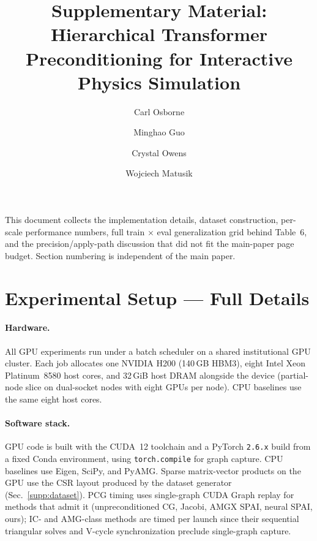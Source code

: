 \documentclass[acmtog]{acmart}
\begin{document}
\title{Supplementary Material: Hierarchical Transformer Preconditioning for Interactive Physics Simulation}

\author{Carl Osborne}

\author{Minghao Guo}

\author{Crystal Owens}

\author{Wojciech Matusik}

\renewcommand{\shortauthors}{Osborne et al.}

\maketitle
\thispagestyle{plain}

This document collects the implementation details, dataset construction,
per-scale performance numbers, full train$\,\times\,$eval generalization grid
behind Table~6, and the precision/apply-path discussion that did not fit the
main-paper page budget. Section numbering is independent of the main paper.

\section{Experimental Setup --- Full Details}
\label{supp:experimental-setup}

\paragraph{Hardware.}
All GPU experiments run under a batch scheduler on a shared institutional GPU
cluster. Each job allocates one NVIDIA H200 (140\,GB HBM3), eight Intel Xeon
Platinum~8580 host cores, and 32\,GiB host DRAM alongside the device (partial-node
slice on dual-socket nodes with eight GPUs per node). CPU baselines use the same
eight host cores.

\paragraph{Software stack.}
GPU code is built with the CUDA~12 toolchain and a PyTorch \texttt{2.6.x} build
from a fixed Conda environment, using \verb|torch.compile| for graph capture. CPU
baselines use Eigen, SciPy, and PyAMG. Sparse matrix-vector products on the GPU use
the CSR layout produced by the dataset generator (Sec.~\ref{supp:dataset}). PCG
timing uses single-graph CUDA Graph replay for methods that admit it
(unpreconditioned CG, Jacobi, AMGX SPAI, neural SPAI, ours); IC- and AMG-class methods
are timed per launch since their sequential triangular solves and V-cycle synchronization
preclude single-graph capture.
\end{document}
